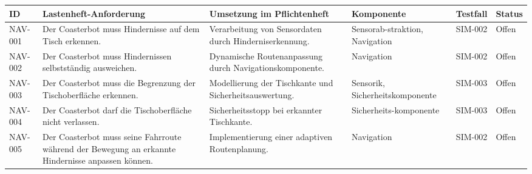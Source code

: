 \documentclass[
  a4paper,
  12pt,
  DIV=12,        %
  parskip=half,  %
  headings=small %
]{scrartcl}
\theoremstyle{definition}
\theoremstyle{definition}
\begin{document}
\begin{longtable}[]{@{}
  >{\raggedright\arraybackslash}p{}
  >{\raggedright\arraybackslash}p{}
  >{\raggedright\arraybackslash}p{}
  >{\raggedright\arraybackslash}p{}
  >{\raggedleft\arraybackslash}p{}
  >{\raggedright\arraybackslash}p{}@{}}
\toprule\noalign{}
\begin{minipage}[b]{\linewidth}\raggedright
ID
\end{minipage} & \begin{minipage}[b]{\linewidth}\raggedright
Lastenheft-Anforderung
\end{minipage} & \begin{minipage}[b]{\linewidth}\raggedright
Umsetzung im Pflichtenheft
\end{minipage} & \begin{minipage}[b]{\linewidth}\raggedright
Komponente
\end{minipage} & \begin{minipage}[b]{\linewidth}\raggedleft
Testfall
\end{minipage} & \begin{minipage}[b]{\linewidth}\raggedright
Status
\end{minipage} \\
\midrule\noalign{}
\endhead
\bottomrule\noalign{}
\endlastfoot
NAV-001 & Der Coasterbot muss Hindernisse auf dem Tisch erkennen. &
Verarbeitung von Sensordaten durch Hinderniserkennung. &
Sensorab-straktion, Navigation & SIM-002 & Offen \\
NAV-002 & Der Coasterbot muss Hindernissen selbstständig ausweichen. &
Dynamische Routenanpassung durch Navigationskomponente. & Navigation &
SIM-002 & Offen \\
NAV-003 & Der Coasterbot muss die Begrenzung der Tischoberfläche
erkennen. & Modellierung der Tischkante und Sicherheitsauswertung. &
Sensorik, Sicherheitskomponente & SIM-003 & Offen \\
NAV-004 & Der Coasterbot darf die Tischoberfläche nicht verlassen. &
Sicherheitsstopp bei erkannter Tischkante. & Sicherheits-komponente &
SIM-003 & Offen \\
NAV-005 & Der Coasterbot muss seine Fahrroute während der Bewegung an
erkannte Hindernisse anpassen können. & Implementierung einer adaptiven
Routenplanung. & Navigation & SIM-002 & Offen \\

\end{longtable}
\end{document}
